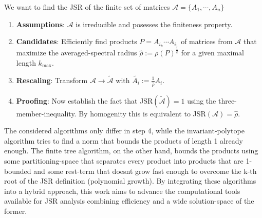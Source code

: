We want to find the JSR of the finite set of matrices $\mathcal{A} = \{A_1, \cdots, A_n\}$
\begin{enumerate}
    \item \textbf{Assumptions}: $\mathcal{A}$ is irreducible and posesses the finiteness property. 
    \item \textbf{Candidates}: Efficiently find products $P = A_{i_k} \cdots A_{i_1}$ of matrices from $\mathcal{A}$ that maximize the averaged-spectral radius $\hat{\rho} := \rho(P)^\frac{1}{k}$ for a given maximal length $k_{\text{max}}$.
    \item \textbf{Rescaling}: Transform $\mathcal{A} \to \tilde{\mathcal{A}}$ with $\tilde{A_i} := \frac{1}{\hat{\rho}} A_i$.
    \item \textbf{Proofing}: Now establish the fact that JSR$(\tilde{\mathcal{A}}) = 1$ using the three-member-inequality. By homogenity this is equivalent to JSR$(\mathcal{A}) = \hat{\rho}$.
\end{enumerate}

The considered algorithms only differ in step 4, while the invariant-polytope algorithm tries to find a norm that bounds the products of length 1 already enough. The finite tree algorithm, on the other hand, bounds the products using some partitioning-space that separates every product into products that are 1-bounded and some rest-term that doesnt grow fast enough to overcome the k-th root of the JSR definition (polynomial growth).
By integrating these algorithms into a hybrid approach, this work aims to advance the computational tools available for JSR analysis combining efficiency and a wide solution-space of the former.
